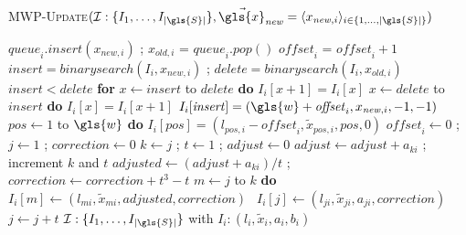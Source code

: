 \begin{algorithm}\footnotesize
	\caption{ \textsc{\gls{MWP}-Update}$(\mathcal{I}: \{I_1, \dots, I_{|\gls{S}|} \}, \vec{\gls{x}}_{\mathit{new}} = \langle x_{\mathit{new},i} \rangle_{i \in \{1,\dots,|\gls{S}|\}})$}\label{indexupdate}
	\begin{algorithmic}[1]
		\State $\mathit{queue}_i.\mathit{insert}(x_{\mathit{new},i})$ ; $x_{\mathit{old},i}$ = $\mathit{queue}_i.\mathit{pop}()$ 
		\State $\mathit{offset}_i$ = $\mathit{offset}_i + 1$
		\State $\mathit{insert} = \mathit{binarysearch}(I_i, x_{\mathit{new},i})$ ; $\mathit{delete} = \mathit{binarysearch}(I_i, x_{\mathit{old},i})$
		 $\mathit{insert} < \mathit{delete}$ {\bfseries for} $x \gets \mathit{insert}$ to $\mathit{delete}$ {\bfseries do} $I_i[x+1] = I_i[x]$
		 $x \gets \mathit{delete}$ to $\mathit{insert}$ {\bfseries do} $I_i[x] = I_i[x+1]$
		\State $I_i[\mathit{insert}] = (\gls{w} + \mathit{offset}_i,x_{\mathit{new},i}, -1, -1)$
		 $\mathit{pos} \gets 1$ to $\gls{w}$ {\bfseries do} $I_i[\mathit{pos}] = (l_{\mathit{pos},i}-\mathit{offset}_i,\tilde{x}_{\mathit{pos},i}, \mathit{pos}, 0)$ 
		\State $\mathit{offset}_i \gets 0$ ; $j \gets 1$ ; $\mathit{correction} \gets 0$
		\State $k \gets j$ ; $t \gets 1$ ; $\mathit{adjust} \gets 0$
		\State $\mathit{adjust} \gets \mathit{adjust} + a_{ki}$ ; increment $k$ and $t$
		\EndWhile
		\State $\mathit{adjusted} \gets (\mathit{adjust} + a_{ki}) / t$ ;  $\mathit{correction} \gets \mathit{correction} + t^3 - t$ 
		 $m \gets j$ to $k$ {\bfseries do} $I_i[m] \gets (l_{mi}, \tilde{x}_{mi}, \mathit{adjusted}, \mathit{correction})$
		\EndIf
		 $~~I_i[j] \gets (l_{ji}, \tilde{x}_{ji}, a_{ji}, \mathit{correction})$
		\State $j \gets j + t$
		\EndWhile
		\EndFor
		 $\mathcal{I}: \{I_1, \dots, I_{|\gls{S}|} \}$ with $I_i: (l_i, \tilde{x}_i, a_i, b_i)$
	\end{algorithmic}
\end{algorithm}

